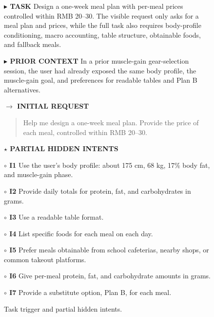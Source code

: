 \documentclass{llmxive}
\providecommand{\tcolorboxCase}[2]{\begin{tcolorbox}[
    title=#1,
    colback=casebg, 
    colframe=casetitlebg,
    rounded corners,
    sharp corners=northeast,
    sharp corners=southwest,
    width=1.00\linewidth,
    boxsep=2pt,
    top=2pt,
    bottom=2pt,
    enhanced,
    breakable,
    before=\setlength{\parindent}{0pt},
]

#2
\end{tcolorbox}
}
\providecommand{\caseZhangshunkaiOneTag}[3]{    {\setlength{\fboxsep}{1.6pt}\colorbox{#1}{\scriptsize\textbf{#3}}}}
\providecommand{\caseZhangshunkaiOneLine}[3]{    \caseZhangshunkaiOneTag{#1}{#2}{#3}\hspace{3pt}}
\begin{document}
\begin{figure}[!htbp]
    \centering
    \tcolorboxCase{Case Study -- Researcher -- Claude 4.6 Opus: Task and Hidden Intents}{
    \small
    \caseZhangshunkaiOneLine{purple!70!black}{white}{$\blacktriangleright$ TASK}
    Design a one-week meal plan with per-meal prices controlled within RMB 20--30.
    The visible request only asks for a meal plan and prices, while the full task also requires body-profile conditioning, macro accounting, table structure, obtainable foods, and fallback meals.

    \vspace{3pt}
    \caseZhangshunkaiOneLine{purple!70!black}{white}{$\blacktriangleright$ PRIOR CONTEXT}
    In a prior muscle-gain gear-selection session, the user had already exposed the same body profile, the muscle-gain goal, and preferences for readable tables and Plan B alternatives.

    \vspace{3pt}
    \caseZhangshunkaiOneLine{blue!65!black}{white}{$\rightarrow$ INITIAL REQUEST}
    \begin{quote}
    \small
    
    Help me design a one-week meal plan. Provide the price of each meal, controlled within RMB 20--30.
    \end{quote}

    \vspace{2pt}
    \caseZhangshunkaiOneLine{orange!80!black}{white}{$\star$ PARTIAL HIDDEN INTENTS}
    \par
    \caseZhangshunkaiOneTag{red!12}{red!70!black}{$\circ$ I1} Use the user's body profile: about 175 cm, 68 kg, 17\% body fat, and muscle-gain phase.
    \par
    \caseZhangshunkaiOneTag{red!12}{red!70!black}{$\circ$ I2} Provide daily totals for protein, fat, and carbohydrates in grams.
    \par
    \caseZhangshunkaiOneTag{red!12}{red!70!black}{$\circ$ I3} Use a readable table format.
    \par
    \caseZhangshunkaiOneTag{red!12}{red!70!black}{$\circ$ I4} List specific foods for each meal on each day.
    \par
    \caseZhangshunkaiOneTag{red!12}{red!70!black}{$\circ$ I5} Prefer meals obtainable from school cafeterias, nearby shops, or common takeout platforms.
    \par
    \caseZhangshunkaiOneTag{red!12}{red!70!black}{$\circ$ I6} Give per-meal protein, fat, and carbohydrate amounts in grams.
    \par
    \caseZhangshunkaiOneTag{red!12}{red!70!black}{$\circ$ I7} Provide a substitute option, Plan B, for each meal.
    }
    \caption{Task trigger and partial hidden intents.}
    \label{fig:case_zhangshunkai_1_claude_task}
\end{figure}
\end{document}
